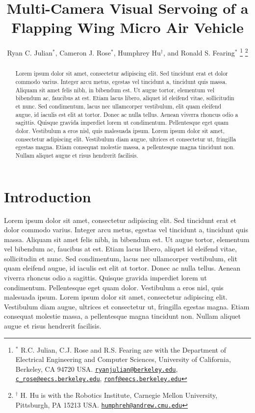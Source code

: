 \documentclass[letterpaper, 10 pt, conference]{ieeeconf}
\title{\LARGE \bf Multi-Camera Visual Servoing of a Flapping Wing Micro Air Vehicle}
\author{
    Ryan C. Julian$^{*}$,
    Cameron J. Rose$^{*}$,
    Humphrey Hu$^{\dagger}$, and
    Ronald S. Fearing$^{*}$
    \thanks{$^{*}$
    	R.C. Julian, C.J. Rose and R.S. Fearing are
        with the Department of Electrical Engineering and Computer Sciences,
        University of California, Berkeley, CA 94720 USA.
        \href{mailto:ryanjulian@berkeley.edu}{\tt ryanjulian@berkeley.edu},
        \href{mailto:c\_rose@eecs.berkeley.edu}{\tt c\_rose@eecs.berkeley.edu},
        \href{mailto:ronf@eecs.berkeley.edu}{\tt ronf@eecs.berkeley.edu}
    }
    \thanks{$^{\dagger}$
        H. Hu is with the Robotics Institute,
        Carnegie Mellon University, Pittsburgh, PA 15213 USA.
        \href{mailto:humphreh@andrew.cmu.edu.edu}{\tt humphreh@andrew.cmu.edu}
    }
}
\begin{document}
\maketitle
\thispagestyle{empty}
\pagestyle{empty}

\begin{abstract}
Lorem ipsum dolor sit amet, consectetur adipiscing elit. Sed tincidunt erat et dolor commodo varius. Integer arcu metus, egestas vel tincidunt a, tincidunt quis massa. Aliquam sit amet felis nibh, in bibendum est. Ut augue tortor, elementum vel bibendum ac, faucibus at est. Etiam lacus libero, aliquet id eleifend vitae, sollicitudin et nunc. Sed condimentum, lacus nec ullamcorper vestibulum, elit quam eleifend augue, id iaculis est elit at tortor. Donec ac nulla tellus. Aenean viverra rhoncus odio a sagittis. Quisque gravida imperdiet lorem ut condimentum. Pellentesque eget quam dolor. Vestibulum a eros nisl, quis malesuada ipsum. Lorem ipsum dolor sit amet, consectetur adipiscing elit. Vestibulum diam augue, ultrices et consectetur ut, fringilla egestas magna. Etiam consequat molestie massa, a pellentesque magna tincidunt non. Nullam aliquet augue et risus hendrerit facilisis.
\end{abstract}

\section{Introduction}
Lorem ipsum dolor sit amet, consectetur adipiscing elit. Sed tincidunt erat et dolor commodo varius. Integer arcu metus, egestas vel tincidunt a, tincidunt quis massa. Aliquam sit amet felis nibh, in bibendum est. Ut augue tortor, elementum vel bibendum ac, faucibus at est. Etiam lacus libero, aliquet id eleifend vitae, sollicitudin et nunc. Sed condimentum, lacus nec ullamcorper vestibulum, elit quam eleifend augue, id iaculis est elit at tortor. Donec ac nulla tellus. Aenean viverra rhoncus odio a sagittis. Quisque gravida imperdiet lorem ut condimentum. Pellentesque eget quam dolor. Vestibulum a eros nisl, quis malesuada ipsum. Lorem ipsum dolor sit amet, consectetur adipiscing elit. Vestibulum diam augue, ultrices et consectetur ut, fringilla egestas magna. Etiam consequat molestie massa, a pellentesque magna tincidunt non. Nullam aliquet augue et risus hendrerit facilisis.
\end{document}
